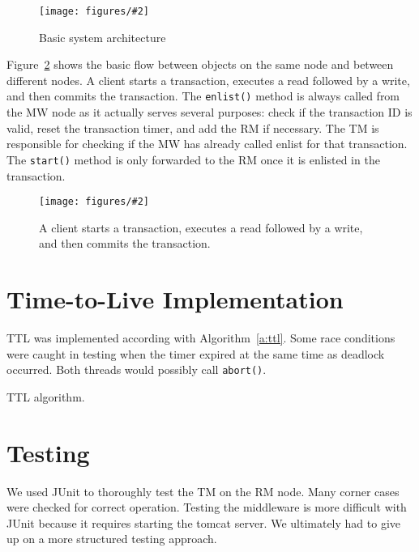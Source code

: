 \documentclass{article}
\newcommand{\addfigure}[4]{

\begin{figure}[h]
	\centering
	\texttt{[image: figures/\#2]}
	\caption{#3}
	\label{#4}
\end{figure}

}
\begin{document}
\addfigure{0.7}{system.pdf}{Basic system architecture}{f:system}

Figure~\ref{f:sequence} shows the basic flow between objects on the same node and between different nodes.
A client starts a transaction, executes a read followed by a write, and then commits the transaction. 
The \texttt{enlist()} method is always called from the MW node as it actually serves several purposes: check if the transaction ID is valid, reset the transaction timer, and add the RM if necessary. 
The TM is responsible for checking if the MW has already called enlist for that transaction. 
The \texttt{start()} method is only forwarded to the RM once it is enlisted in the transaction.

\addfigure{0.65}{sequence.pdf}{A client starts a transaction, executes a read followed by a write, and then commits the transaction.}{f:sequence}

\section{Time-to-Live Implementation}

TTL was implemented according with Algorithm~\ref{a:ttl}. Some race conditions were caught in testing when the timer expired at the same time as deadlock occurred. Both threads would possibly call \texttt{abort()}.

\begin{algorithm}
 
 \caption{TTL algorithm.}
 \label{a:ttl}
 \end{algorithm}

\section{Testing}
We used JUnit to thoroughly test the TM on the RM node. Many corner cases were checked for correct operation. Testing the middleware is more difficult with JUnit because it requires starting the tomcat server. We ultimately had to give up on a more structured testing approach.
 
\end{document}
